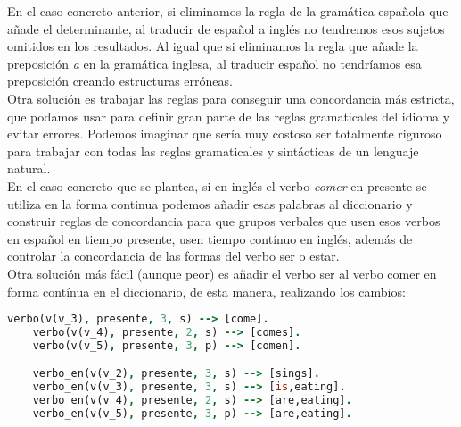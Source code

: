\documentclass{article}
\begin{document}
En el caso concreto anterior, si eliminamos la regla de la gramática española que añade el determinante, al traducir de español a inglés no tendremos esos sujetos omitidos en los resultados.
Al igual que si eliminamos la regla que añade la preposición \textit{a} en la gramática inglesa, al traducir español no tendríamos esa preposición creando estructuras erróneas. \\

Otra solución es trabajar las reglas para conseguir una concordancia más estricta, que podamos usar para definir gran parte 
de las reglas gramaticales del idioma y evitar errores. Podemos imaginar que sería muy costoso ser totalmente riguroso para 
trabajar con todas las reglas gramaticales y sintácticas de un lenguaje natural. \\

En el caso concreto que se plantea, si en inglés el verbo \textit{comer} en presente se utiliza en la forma continua podemos 
añadir esas palabras al diccionario y construir reglas de concordancia para que grupos verbales que usen esos verbos en español
en tiempo presente, usen tiempo contínuo en inglés, además de controlar la concordancia de las formas del verbo ser o estar. \\

Otra solución más fácil (aunque peor) es añadir el verbo ser al verbo comer en forma contínua en el diccionario, de esta manera, 
realizando los cambios:

\begin{lstlisting}[breaklines=true, language=Prolog]
    verbo(v(v_3), presente, 3, s) --> [come].
    verbo(v(v_4), presente, 2, s) --> [comes].
    verbo(v(v_5), presente, 3, p) --> [comen].

    verbo_en(v(v_2), presente, 3, s) --> [sings].
    verbo_en(v(v_3), presente, 3, s) --> [is,eating].
    verbo_en(v(v_4), presente, 2, s) --> [are,eating].
    verbo_en(v(v_5), presente, 3, p) --> [are,eating].
\end{lstlisting}
\end{document}
